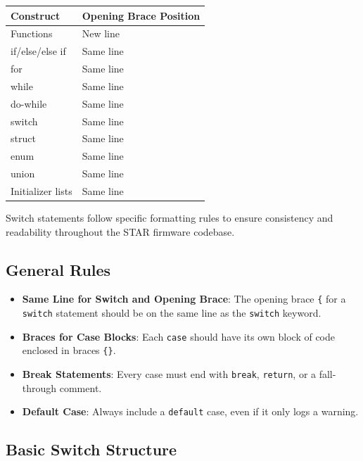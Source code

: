 \begin{center}
\begin{tabular}{|l|l|}
\hline
\textbf{Construct} & \textbf{Opening Brace Position} \\
\hline
Functions & New line \\
\hline
if/else/else if & Same line \\
\hline
for & Same line \\
\hline
while & Same line \\
\hline
do-while & Same line \\
\hline
switch & Same line \\
\hline
struct & Same line \\
\hline
enum & Same line \\
\hline
union & Same line \\
\hline
Initializer lists & Same line \\
\hline
\end{tabular}
\end{center}



Switch statements follow specific formatting rules to ensure consistency and readability throughout the STAR firmware codebase.

\subsection{General Rules}

\begin{itemize}
    \item \textbf{Same Line for Switch and Opening Brace}: The opening brace \texttt{\{} for a \texttt{switch} statement should be on the same line as the \texttt{switch} keyword.
    \item \textbf{Braces for Case Blocks}: Each \texttt{case} should have its own block of code enclosed in braces \texttt{\{\}}.
    \item \textbf{Break Statements}: Every case must end with \texttt{break}, \texttt{return}, or a fall-through comment.
    \item \textbf{Default Case}: Always include a \texttt{default} case, even if it only logs a warning.
\end{itemize}

\subsection{Basic Switch Structure}


